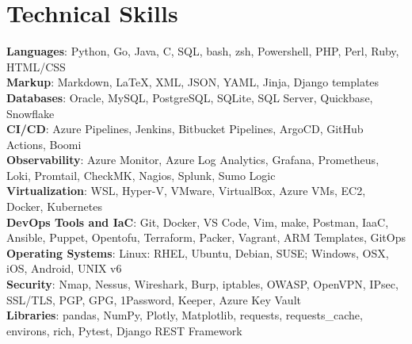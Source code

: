 \section{Technical Skills}
 \begin{itemize}[leftmargin=0.15in, label={}]
    \small{\item{
     \textbf{Languages}{: Python, Go, Java, C, SQL, bash, zsh, Powershell, PHP, Perl, Ruby, HTML/CSS} \\
     \textbf{Markup}{: Markdown, LaTeX, XML, JSON, YAML, Jinja, Django templates} \\
     \textbf{Databases}{: Oracle, MySQL, PostgreSQL, SQLite, SQL Server, Quickbase, Snowflake} \\
     \textbf{CI/CD}{: Azure Pipelines, Jenkins, Bitbucket Pipelines, ArgoCD, GitHub Actions, Boomi} \\
     \textbf{Observability}{: Azure Monitor, Azure Log Analytics, Grafana, Prometheus, Loki, Promtail, CheckMK, Nagios, Splunk, Sumo Logic} \\
     \textbf{Virtualization}{: WSL, Hyper-V, VMware, VirtualBox, Azure VMs, EC2, Docker, Kubernetes} \\
     \textbf{DevOps Tools and IaC}{: Git, Docker, VS Code, Vim, make, Postman, IaaC, Ansible, Puppet, Opentofu, Terraform, Packer, Vagrant, ARM Templates, GitOps} \\
     \textbf{Operating Systems}{: Linux: RHEL, Ubuntu, Debian, SUSE; Windows, OSX, iOS, Android, UNIX v6} \\
     \textbf{Security}{: Nmap, Nessus, Wireshark, Burp, iptables, OWASP, OpenVPN, IPsec, SSL/TLS, PGP, GPG, 1Password, Keeper, Azure Key Vault} \\
     \textbf{Libraries}{: pandas, NumPy, Plotly, Matplotlib, requests, requests\_cache, environs, rich, Pytest, Django REST Framework} \\
    }}
 \end{itemize}